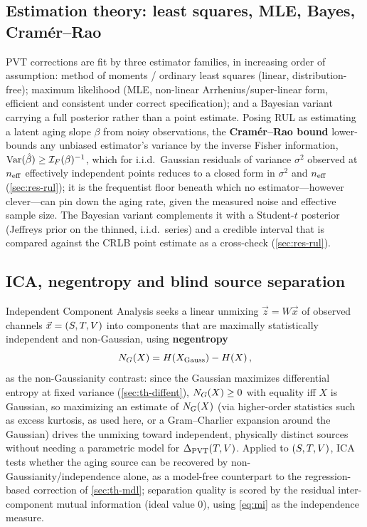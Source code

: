 \subsection{Estimation theory: least squares, MLE, Bayes, Cram\'er--Rao}
\label{sec:th-estimation}
PVT corrections are fit by three estimator families, in increasing order of
assumption: method of moments / ordinary least squares (linear, distribution-free);
maximum likelihood (MLE, non-linear Arrhenius/super-linear form, efficient and
consistent under correct specification); and a Bayesian variant carrying a full
posterior rather than a point estimate. Posing RUL as estimating a latent aging
slope $\beta$ from noisy observations, the \textbf{Cram\'er--Rao bound} lower-bounds
any unbiased estimator's variance by the inverse Fisher information,
$\mathrm{Var}(\hat\beta)\ge \mathcal{I}_F(\beta)^{-1}$, which for i.i.d.\ Gaussian residuals of
variance $\sigma^2$ observed at $n_{\mathrm{eff}}$ effectively independent points reduces
to a closed form in $\sigma^2$ and $n_{\mathrm{eff}}$ (\cref{sec:res-rul}); it is the
frequentist floor beneath which no estimator---however clever---can pin down the
aging rate, given the measured noise and effective sample size. The Bayesian
variant complements it with a Student-$t$ posterior (Jeffreys prior on the
thinned, i.i.d.\ series) and a credible interval that is compared against the
CRLB point estimate as a cross-check (\cref{sec:res-rul}).

\subsection{ICA, negentropy and blind source separation}
\label{sec:th-ica}
Independent Component Analysis seeks a linear unmixing $\vec z = W\vec x$ of
observed channels $\vec x=(S,T,V)$ into components that are
maximally statistically independent and non-Gaussian, using
\textbf{negentropy}
\begin{equation}
  N_G\!\left(X\right) = H\!\left(X_{\text{Gauss}}\right) - H\!\left(X\right),
  \label{eq:negentropy}
\end{equation}
as the non-Gaussianity contrast: since the Gaussian maximizes differential
entropy at fixed variance (\cref{sec:th-diffent}), $N_G\!\left(X\right)\ge0$ with equality
iff $X$ is Gaussian, so maximizing an estimate of $N_G\!\left(X\right)$ (via higher-order
statistics such as excess kurtosis, as used here, or a Gram--Charlier expansion
around the Gaussian) drives the unmixing toward independent, physically
distinct sources without needing a parametric model for $\Delta_{\mathrm{PVT}}(T,V)$.
Applied to $(S,T,V)$, ICA tests whether the aging source can be
recovered by non-Gaussianity/independence alone, as a model-free counterpart to
the regression-based correction of \cref{sec:th-mdl}; separation quality is
scored by the residual inter-component mutual information (ideal value $0$),
using \cref{eq:mi} as the independence measure.

